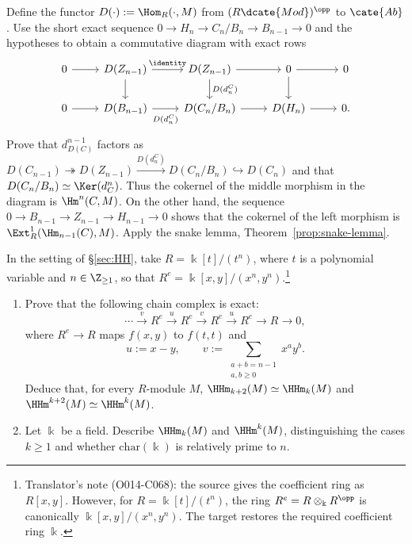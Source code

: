 \begin{Exercises}
	\begin{hint}
		Define the functor $D(\cdot):=\Hom_R(\cdot,M)$ from
		$(R\dcate{Mod})^{\opp}$ to $\cate{Ab}$. Use the short exact sequence
		$0\to H_n\to C_n/B_n\to B_{n-1}\to0$ and the hypotheses to obtain a
		commutative diagram with exact rows
		\[
		\begin{tikzcd}
			0 \arrow[r] &
			D(Z_{n-1}) \arrow[r, "\identity"] \arrow[d] &
			D(Z_{n-1}) \arrow[r] \arrow[d, "{D(d^C_n)}"] &
			0 \arrow[r] \arrow[d] & 0 \\
			0 \arrow[r] &
			D(B_{n-1}) \arrow[r, "{D(d^C_n)}"' inner sep=0.5em] &
			D(C_n/B_n) \arrow[r] &
			D(H_n) \arrow[r] & 0 .
		\end{tikzcd}
		\]
		Prove that $d_{D(C)}^{n-1}$ factors as
		$D(C_{n-1})\twoheadrightarrow D(Z_{n-1})
		\xrightarrow{D(d^C_n)}D(C_n/B_n)\hookrightarrow D(C_n)$ and that
		$D(C_n/B_n)\simeq\Ker(d_C^n)$. Thus the cokernel of the middle
		morphism in the diagram is $\Hm^n(C,M)$. On the other hand, the
		sequence $0\to B_{n-1}\to Z_{n-1}\to H_{n-1}\to0$ shows that the
		cokernel of the left morphism is
		$\Ext_R^1(\Hm_{n-1}(C),M)$. Apply the snake lemma,
		Theorem~\ref{prop:snake-lemma}.
	\end{hint}

	\item In the setting of \S\ref{sec:HH}, take
	$R=\Bbbk[t]/(t^n)$, where $t$ is a polynomial variable and
	$n\in\Z_{\geq1}$, so that
	$R^e=\Bbbk[x,y]/(x^n,y^n)$.\footnote{Translator's note (O014-C068): the
	source gives the coefficient ring as $R[x,y]$. However, for
	$R=\Bbbk[t]/(t^n)$, the ring
	$R^e=R\otimes_{\Bbbk}R^{\opp}$ is canonically
	$\Bbbk[x,y]/(x^n,y^n)$. The target restores the required coefficient ring
	$\Bbbk$.}
	\begin{enumerate}
		\item Prove that the following chain complex is exact:
		\[
			\cdots\xrightarrow{v}R^e\xrightarrow{u}R^e
			\xrightarrow{v}R^e\xrightarrow{u}R^e\to R\to0,
		\]
		where $R^e\to R$ maps $f(x,y)$ to $f(t,t)$ and
		\[
			u:=x-y,\qquad
			v:=\sum_{\substack{a+b=n-1\\a,b\geq0}}x^ay^b.
		\]
		Deduce that, for every $R$-module $M$,
		$\HHm_{k+2}(M)\simeq\HHm_k(M)$ and
		$\HHm^{k+2}(M)\simeq\HHm^k(M)$.
		\item Let $\Bbbk$ be a field. Describe $\HHm_k(M)$ and $\HHm^k(M)$,
		distinguishing the cases $k\geq1$ and whether
		$\mathrm{char}(\Bbbk)$ is relatively prime to $n$.
	\end{enumerate}


\end{Exercises}
